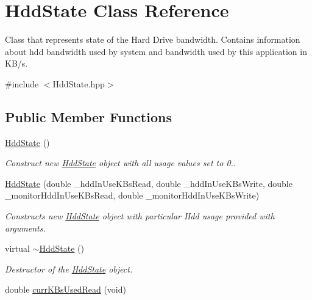 \hypertarget{classHddState}{}\section{Hdd\+State Class Reference}
\label{classHddState}


Class that represents state of the Hard Drive bandwidth. Contains information about hdd bandwidth used by system and bandwidth used by this application in K\+B/s.  




{\ttfamily \#include $<$Hdd\+State.\+hpp$>$}

\subsection*{Public Member Functions}
\begin{DoxyCompactItemize}
\item 
\hyperlink{classHddState_aeede4fb6849df17862cd8ab0f0c312db}{Hdd\+State} ()\hypertarget{classHddState_aeede4fb6849df17862cd8ab0f0c312db}{}\label{classHddState_aeede4fb6849df17862cd8ab0f0c312db}

\begin{DoxyCompactList}\small\item\em Construct new \hyperlink{classHddState}{Hdd\+State} object with all usage values set to 0.. \end{DoxyCompactList}\item 
\hyperlink{classHddState_a8f0a4f976c42a689c31aa8f3c750b9d4}{Hdd\+State} (double \+\_\+hdd\+In\+Use\+K\+Bs\+Read, double \+\_\+hdd\+In\+Use\+K\+Bs\+Write, double \+\_\+monitor\+Hdd\+In\+Use\+K\+Bs\+Read, double \+\_\+monitor\+Hdd\+In\+Use\+K\+Bs\+Write)\hypertarget{classHddState_a8f0a4f976c42a689c31aa8f3c750b9d4}{}\label{classHddState_a8f0a4f976c42a689c31aa8f3c750b9d4}

\begin{DoxyCompactList}\small\item\em Constructs new \hyperlink{classHddState}{Hdd\+State} object with particular Hdd usage provided with arguments. \end{DoxyCompactList}\item 
virtual \hyperlink{classHddState_a49fb29be01a1fe7bbd6d43c559f5928d}{$\sim$\+Hdd\+State} ()\hypertarget{classHddState_a49fb29be01a1fe7bbd6d43c559f5928d}{}\label{classHddState_a49fb29be01a1fe7bbd6d43c559f5928d}

\begin{DoxyCompactList}\small\item\em Destructor of the \hyperlink{classHddState}{Hdd\+State} object. \end{DoxyCompactList}\item 
double \hyperlink{classHddState_a48b849ce238b6e830169e39d81ebd2f8}{curr\+K\+Bs\+Used\+Read} (void)\hypertarget{classHddState_a48b849ce238b6e830169e39d81ebd2f8}{}\label{classHddState_a48b849ce238b6e830169e39d81ebd2f8}


\end{DoxyCompactItemize}
